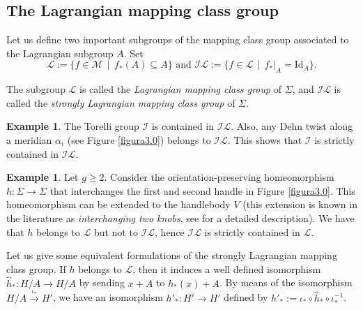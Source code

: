\documentclass[10pt]{amsart}
\numberwithin{equation}{section}
\numberwithin{equation}{section}
\theoremstyle{definition}
\newtheorem{example}[theorem]{Example}
\begin{document}
\subsection{The Lagrangian mapping class group}\label{seccion3.2}

Let us define two important subgroups of the mapping class group associated to the Lagrangian subgroup $A$. Set
\begin{equation}\label{ecuacion3.4}%
\mathcal{L}:=\{f\in\mathcal{M}\ \ |\ \ f_{*}(A)\subseteq A\}  \text{\ \ \ \ \ \ \ and \ \ \ \ \ \ }  \mathcal{IL}:=\{f\in\mathcal{L}\ \ |\ \ {f_*}|_A=\text{Id}_A\}.
\end{equation}

\noindent The subgroup $\mathcal{L}$ is called   the \emph{Lagrangian mapping class group} of $\Sigma$,  and $\mathcal{IL}$ is called the  \emph{strongly Lagrangian mapping class group} of $\Sigma$. 

\begin{example} The Torelli group $\mathcal{I}$ is contained in $\mathcal{IL}$. Also, any Dehn twist along a meridian $\alpha_i$ (see Figure \ref{figura3.0}) belongs to $\mathcal{IL}$. This shows that $\mathcal{I}$ is strictly contained in $\mathcal{IL}$.
\end{example}

\begin{example} Let $g\geq2$. Consider the orientation-preserving homeomorphism $h:\Sigma \rightarrow \Sigma$ that interchanges the first and second handle in Figure \ref{figura3.0}. This homeomorphism   can be extended to the handlebody $V$ (this extension is known in the literature as \emph{interchanging two knobs}, see \cite[Section 3]{MR0433433} for a detailed description). We have  that $h$ belongs to $\mathcal{L}$ but not to $\mathcal{IL}$, hence $\mathcal{IL}$ is strictly contained in $\mathcal{L}$.  
\end{example}

Let us give some equivalent formulations of the strongly Lagrangian mapping class group. If $h$ belongs to $\mathcal{L}$, then it induces a well defined isomorphism $\hat{h}_*:H/A\rightarrow H/A$ by sending $x+A$ to $h_{*}(x)+A$. By means of  the isomorphism $H/A\stackrel{\iota_*}{\longrightarrow}H'$, we have an isomorphism $h'_*:H'\rightarrow H'$ defined by $h'_*:=\iota_*\circ \hat{h}_*\circ \iota_*^{-1}$.
\end{document}
